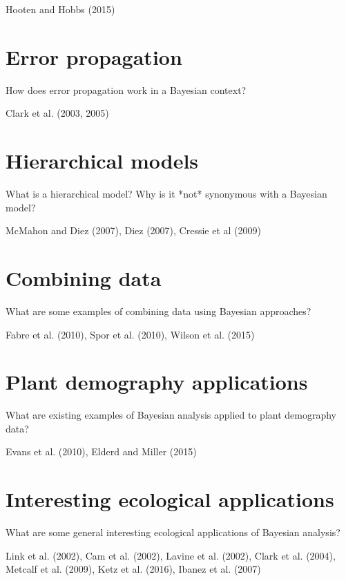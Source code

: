 \documentclass[12pt, oneside, titlepage]{article}   	%
\begin{document}
Hooten and Hobbs (2015)

\section*{Error propagation}

How does error propagation work in a Bayesian context?

Clark et al. (2003, 2005)

\section*{Hierarchical models}

What is a hierarchical model? Why is it *not* synonymous with a Bayesian model?

McMahon and Diez (2007), Diez (2007), Cressie et al (2009)

\section*{Combining data}

What are some examples of combining data using Bayesian approaches?

Fabre et al. (2010), Spor et al. (2010), Wilson et al. (2015)

\section*{Plant demography applications}

What are existing examples of Bayesian analysis applied to plant demography data?

Evans et al. (2010), Elderd and Miller (2015)

\section*{Interesting ecological applications}

What are some general interesting ecological applications of Bayesian analysis?

Link et al. (2002), Cam et al. (2002), Lavine et al. (2002), Clark et al. (2004), Metcalf et al. (2009), Ketz et al. (2016), Ibanez et al. (2007)

\clearpage

\end{document}
